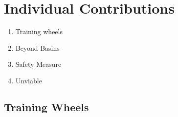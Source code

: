 \section{Individual Contributions}
\begin{enumerate}
    \item Training wheels
    \item Beyond Basins
    \item Safety Measure
    \item Unviable
\end{enumerate}

\subsection{Training Wheels}


